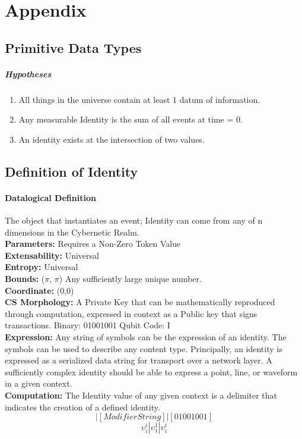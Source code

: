 \documentclass{article}
\begin{document}
\section{Appendix}
\subsection{Primitive Data Types}
\subparagraph{Hypotheses}
		\begin{enumerate}
			\item All things in the universe contain at least 1 datum of information. 
			\item Any measurable Identity is the sum of all events at time = 0.
			\item An identity exists at the intersection of two values. 
		\end{enumerate}
	
\subsection{Definition of Identity}

	\paragraph{Datalogical Definition}
		The object that instantiates an event; Identity can come from any of n dimensions in the Cybernetic Realm. \\
		\textbf{Parameters:} Requires a Non-Zero Token Value \\
		\textbf{Extensability:}  Universal\\
		\textbf{Entropy:}  Universal \\
		\textbf{Bounds:}  ($\pi$, $\pi$)  Any sufficiently large unique number. \\
		\textbf{Coordinate:} (0,0)  \\
		\textbf{CS Morphology:}  A Private Key that can be mathematically reproduced through computation, expressed in context as a Public key that signs transactions.  Binary:  01001001    Qubit Code: I \\
		\textbf{Expression:} Any string of symbols can be the expression of an identity.  The symbols can be used to describe any content type.  Principally, an identity is expressed as a serialized data string for transport over a network layer.  A sufficiently complex identity should be able to express a point, line, or waveform in a given context.\\
		\textbf{Computation:} The Identity value of any given context is a delimiter that indicates the creation of a defined identity.\\
			\begin{equation}
				[01001001]  |  [Modifier String]  |  [01001001]
			\end{equation}
			\begin{equation}
				\upsilon_i^i  |  \upsilon_1^1  |  \upsilon_i^i
			\end{equation}
\end{document}
